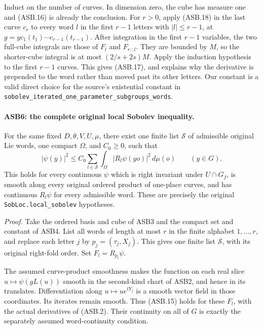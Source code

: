 Induct on the number of curves.  In dimension zero, the cube
has measure one and (ASB.16) is already the conclusion.
For \(r>0\), apply (ASB.18) in the last curve \(c_r\) to
every word \(l\) in the first \(r-1\) letters with \(|l|\le r-1\),
at \(g=yc_1(t_1)\cdots c_{r-1}(t_{r-1})\).
After integration in the first \(r-1\) variables, the two
full-cube integrals are those of \(F_l\) and \(F_{r::l}\).
They are bounded by \(M\), so the shorter-cube integral is
at most \((2/s+2s)M\).
Apply the induction hypothesis to the first \(r-1\) curves.
This gives (ASB.17), and explains why the derivative is
prepended to the word rather than moved past its other letters.
Our constant is a valid direct choice for the source's
existential constant in
\texttt{sobolev\_iterated\_one\_parameter\_subgroups\_words}.

\paragraph{ASB6: the complete original local Sobolev inequality.}
\label{claim:ASB6}
For the same fixed \(D,\theta,V,U,\mu\), there exist one finite
list \(\mathcal S\) of admissible original Lie words, one compact
\(\Omega\), and \(C_0\ge0\), such that
\[
 |\psi(y)|^2\le C_0\sum_{l\in\mathcal S}
                    \int_\Omega|R_l\psi(yo)|^2\,d\mu(o)
                       \qquad(y\in G).
 \tag{ASB.19}
\]
This holds for every continuous \(\psi\) which is right invariant
under \(U\cap G_f\), is smooth along every original ordered
product of one-place curves, and has continuous \(R_l\psi\) for
every admissible word.  These are precisely the original
\texttt{SobLoc.local\_sobolev} hypotheses.

\emph{Proof.}
Take the ordered basis and cube of ASB3 and the compact set and
constant of ASB4.  List all words of length at most \(r\) in the
finite alphabet \(1,\ldots,r\), and replace each letter \(j\)
by \(p_j=(\tau_j,X_j)\).  This gives one finite list
\(\mathcal S\), with its original right-fold order.
Set \(F_l=R_{p_l}\psi\).

The assumed curve-product smoothness makes the function on
each real slice \(u\mapsto\psi(gL(u))\) smooth in the
second-kind chart of ASB2, and hence in its translates.
Differentiation along \(u\mapsto ue^{tY_j}\) is a smooth vector
field in those coordinates.  Its iterates remain smooth.
Thus (ASB.15) holds for these \(F_l\), with the actual
derivatives of (ASB.2).  Their continuity on all of \(G\)
is exactly the separately assumed word-continuity condition.

